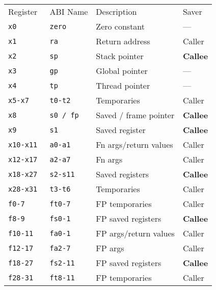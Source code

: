 \begin{footnotesize}
    \renewcommand{\arraystretch}{1.2}
    \setlength\tabcolsep{6pt} %
    \begin{tabularx}{\linewidth}{@{}llll@{}}
        Register     & ABI Name     & Description           & Saver           \\
        \cmidrule{1-4}
        \tt{x0}      & \tt{zero}    & Zero constant         & ---             \\
        \tt{x1}      & \tt{ra}      & Return address        & Caller          \\
        \tt{x2}      & \tt{sp}      & Stack pointer         & \textbf{Callee} \\
        \tt{x3}      & \tt{gp}      & Global pointer        & ---             \\
        \tt{x4}      & \tt{tp}      & Thread pointer        & ---             \\
        \tt{x5-x7}   & \tt{t0-t2}   & Temporaries           & Caller          \\
        \tt{x8}      & \tt{s0 / fp} & Saved / frame pointer & \textbf{Callee} \\
        \tt{x9}      & \tt{s1}      & Saved register        & \textbf{Callee} \\
        \tt{x10-x11} & \tt{a0-a1}   & Fn args/return values & Caller          \\
        \tt{x12-x17} & \tt{a2-a7}   & Fn args               & Caller          \\
        \tt{x18-x27} & \tt{s2-s11}  & Saved registers       & \textbf{Callee} \\
        \tt{x28-x31} & \tt{t3-t6}   & Temporaries           & Caller          \\
        \cmidrule{1-4}
        \tt{f0-7}    & \tt{ft0-7}   & FP temporaries        & Caller          \\
        \tt{f8-9}    & \tt{fs0-1}   & FP saved registers    & \textbf{Callee} \\
        \tt{f10-11}  & \tt{fa0-1}   & FP args/return values & Caller          \\
        \tt{f12-17}  & \tt{fa2-7}   & FP args               & Caller          \\
        \tt{f18-27}  & \tt{fs2-11}  & FP saved registers    & \textbf{Callee} \\
        \tt{f28-31}  & \tt{ft8-11}  & FP temporaries        & Caller          \\
    \end{tabularx}
    \renewcommand{\arraystretch}{1}
    \setlength\tabcolsep{6pt} %
\end{footnotesize}